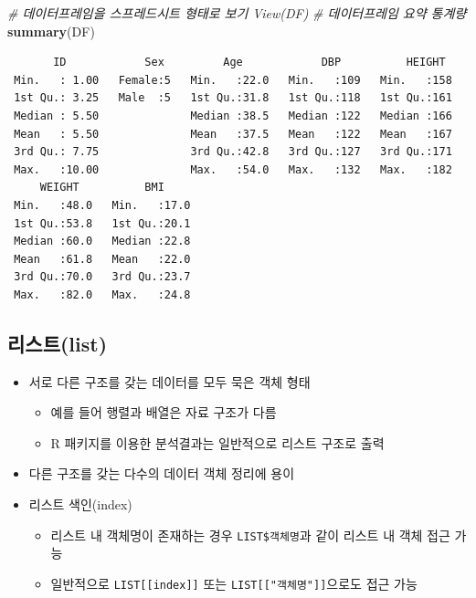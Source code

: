 \documentclass[11pt,a4paper]{book}
\newenvironment{Shaded}{\begin{snugshade}}{\end{snugshade}}
\newcommand{\KeywordTok}[1]{\textcolor[rgb]{0.13,0.29,0.53}{\textbf{#1}}}
\newcommand{\CommentTok}[1]{\textcolor[rgb]{0.56,0.35,0.01}{\textit{#1}}}
\newcommand{\NormalTok}[1]{#1}
\providecommand{\tightlist}{%
  \setlength{\itemsep}{0pt}\setlength{\parskip}{0pt}}
\theoremstyle{definition}
\theoremstyle{definition}
\theoremstyle{definition}
\theoremstyle{remark}
\begin{document}
\begin{Shaded}
\begin{Highlighting}[]
\CommentTok{# 데이터프레임을 스프레드시트 형태로 보기 View(DF)}
\CommentTok{# 데이터프레임 요약 통계량}
\KeywordTok{summary}\NormalTok{(DF)}
\end{Highlighting}
\end{Shaded}

\begin{verbatim}
       ID            Sex         Age            DBP          HEIGHT   
 Min.   : 1.00   Female:5   Min.   :22.0   Min.   :109   Min.   :158  
 1st Qu.: 3.25   Male  :5   1st Qu.:31.8   1st Qu.:118   1st Qu.:161  
 Median : 5.50              Median :38.5   Median :122   Median :166  
 Mean   : 5.50              Mean   :37.5   Mean   :122   Mean   :167  
 3rd Qu.: 7.75              3rd Qu.:42.8   3rd Qu.:127   3rd Qu.:171  
 Max.   :10.00              Max.   :54.0   Max.   :132   Max.   :182  
     WEIGHT          BMI      
 Min.   :48.0   Min.   :17.0  
 1st Qu.:53.8   1st Qu.:20.1  
 Median :60.0   Median :22.8  
 Mean   :61.8   Mean   :22.0  
 3rd Qu.:70.0   3rd Qu.:23.7  
 Max.   :82.0   Max.   :24.8  
\end{verbatim}

\normalsize

\subsection{리스트(list)}\label{list}

\begin{itemize}
\tightlist
\item
  서로 다른 구조를 갖는 데이터를 모두 묵은 객체 형태

  \begin{itemize}
  \tightlist
  \item
    예를 들어 행렬과 배열은 자료 구조가 다름
  \item
    R 패키지를 이용한 분석결과는 일반적으로 리스트 구조로 출력
  \end{itemize}
\item
  다른 구조를 갖는 다수의 데이터 객체 정리에 용이
\item
  리스트 색인(index)

  \begin{itemize}
  \tightlist
  \item
    리스트 내 객체명이 존재하는 경우 \texttt{LIST\$객체명}과 같이 리스트
    내 객체 접근 가능
  \item
    일반적으로 \texttt{LIST{[}{[}index{]}{]}} 또는
    \texttt{LIST{[}{[}"객체명"{]}{]}}으로도 접근 가능
  \end{itemize}
\end{itemize}
\end{document}
